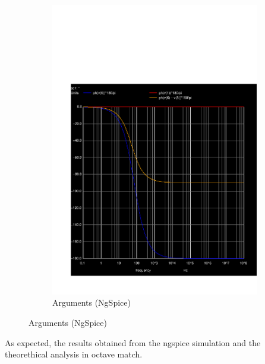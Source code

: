 \begin{figure}[H]
\begin{subfigure}{0.3\textwidth}
\includegraphics[width=\textwidth]{sim5_ph.pdf}
\caption{Arguments (NgSpice)}
\label{fig:second}
\end{subfigure}
\end{figure}

As expected, the results obtained from the ngspice simulation and the theorethical analysis in octave match.

